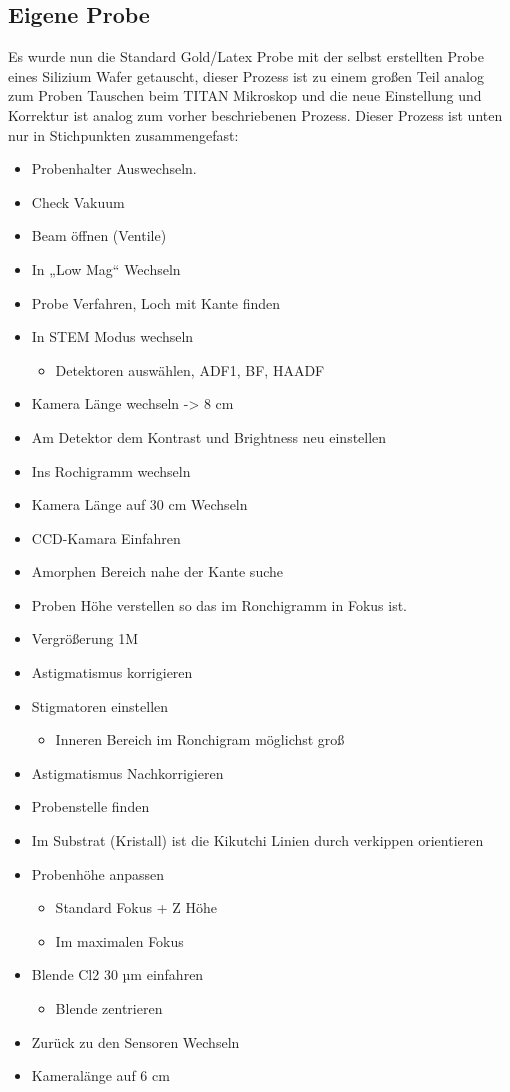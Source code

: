 \subsection{Eigene Probe}
Es wurde nun die Standard Gold/Latex Probe mit der selbst erstellten Probe eines Silizium Wafer getauscht, dieser Prozess ist zu einem großen Teil analog zum Proben Tauschen beim TITAN Mikroskop und die neue Einstellung und Korrektur ist analog zum vorher beschriebenen Prozess. Dieser Prozess ist unten nur in Stichpunkten zusammengefast:
\begin{itemize}
 \item Probenhalter Auswechseln.
 \item Check Vakuum
 \item Beam öffnen (Ventile)
 \item In „Low Mag“ Wechseln 
 \item Probe Verfahren, Loch mit Kante finden
 \item In STEM Modus wechseln
 \begin{itemize}
   \item Detektoren auswählen, ADF1, BF, HAADF
 \end{itemize}  
 \item Kamera Länge wechseln -> 8 cm
 \item Am Detektor dem Kontrast und Brightness neu einstellen
 \item Ins Rochigramm wechseln
 \item Kamera Länge auf 30 cm Wechseln
 \item CCD-Kamara Einfahren 
 \item Amorphen Bereich nahe der Kante suche
 \item Proben Höhe verstellen so das im Ronchigramm in Fokus ist.
 \item Vergrößerung 1M
 \item Astigmatismus korrigieren 
 \item Stigmatoren einstellen
 \begin{itemize}
   \item Inneren Bereich im Ronchigram möglichst groß 
 \end{itemize}  
 \item Astigmatismus Nachkorrigieren
 \item Probenstelle finden
 \item Im Substrat (Kristall) ist die Kikutchi Linien durch verkippen orientieren
 \item Probenhöhe anpassen
 \begin{itemize}
   \item Standard Fokus + Z Höhe
   \item Im maximalen Fokus
 \end{itemize}
 \item Blende Cl2 30 µm einfahren
 \begin{itemize}
  \item Blende zentrieren
 \end{itemize}
 \item Zurück zu den Sensoren Wechseln
 \item Kameralänge auf 6 cm
\end{itemize}

